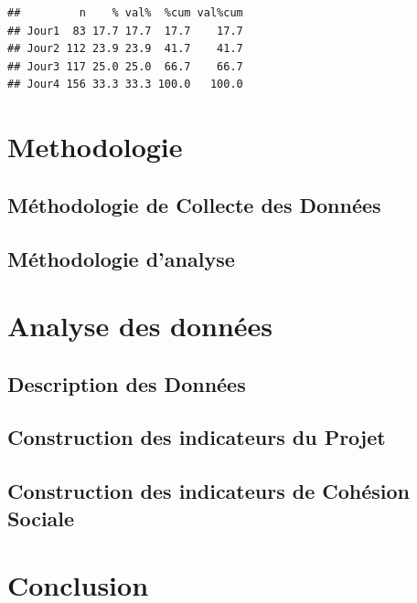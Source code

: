 \documentclass[
]{book}
\begin{document}
\begin{verbatim}
##         n    % val%  %cum val%cum
## Jour1  83 17.7 17.7  17.7    17.7
## Jour2 112 23.9 23.9  41.7    41.7
## Jour3 117 25.0 25.0  66.7    66.7
## Jour4 156 33.3 33.3 100.0   100.0
\end{verbatim}

\hypertarget{methodologie}{%
\chapter{Methodologie}\label{methodologie}}

\hypertarget{muxe9thodologie-de-collecte-des-donnuxe9es}{%
\section{Méthodologie de Collecte des Données}\label{muxe9thodologie-de-collecte-des-donnuxe9es}}

\hypertarget{muxe9thodologie-danalyse}{%
\section{Méthodologie d'analyse}\label{muxe9thodologie-danalyse}}

\hypertarget{analyse-des-donnuxe9es}{%
\chapter{Analyse des données}\label{analyse-des-donnuxe9es}}

\hypertarget{description-des-donnuxe9es}{%
\section{Description des Données}\label{description-des-donnuxe9es}}

\hypertarget{construction-des-indicateurs-du-projet}{%
\section{Construction des indicateurs du Projet}\label{construction-des-indicateurs-du-projet}}

\hypertarget{construction-des-indicateurs-de-cohuxe9sion-sociale}{%
\section{Construction des indicateurs de Cohésion Sociale}\label{construction-des-indicateurs-de-cohuxe9sion-sociale}}

\hypertarget{conclusion}{%
\chapter{Conclusion}\label{conclusion}}

  
\end{document}
